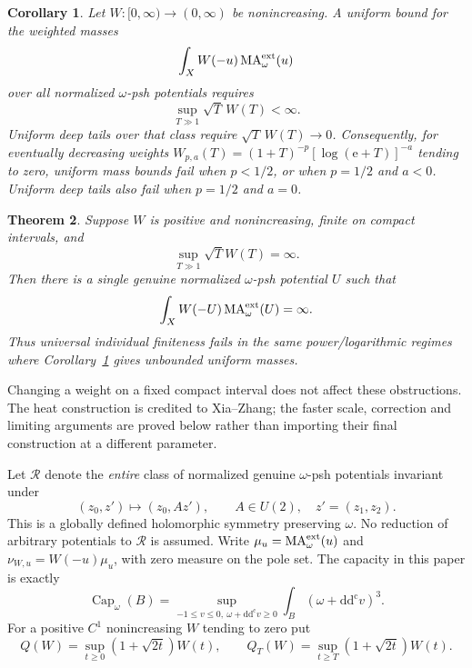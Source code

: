 \documentclass[11pt]{article}
\newtheorem{theorem}{Theorem}
\newtheorem{corollary}[theorem]{Corollary}
\theoremstyle{remark}
\newcommand{\ddc}{\mathrm{d}\mathrm{d}^{\mathrm c}}
\newcommand{\MA}{\operatorname{MA}}
\begin{document}
\begin{corollary}\label{cor:weights}
Let $W:[0,\infty)\to(0,\infty)$ be nonincreasing. A uniform bound for the
weighted masses
\[
 \int_X W(-u)\MA^{\rm ext}_\omega(u)
\]
over all normalized $\omega$-psh potentials requires
\[
 \sup_{T\gg1}\sqrt T\,W(T)<\infty.
\]
Uniform deep tails over that class require $\sqrt T\,W(T)\to0$.
Consequently, for eventually decreasing weights
$W_{p,a}(T)=(1+T)^{-p}[\log(\mathrm e+T)]^{-a}$ tending to zero,
uniform mass bounds fail when $p<1/2$, or when $p=1/2$ and $a<0$.
Uniform deep tails also fail when $p=1/2$ and $a=0$.
\end{corollary}

\begin{theorem}\label{thm:individual}
Suppose $W$ is positive and nonincreasing, finite on compact intervals, and
\[
 \sup_{T\gg1}\sqrt T W(T)=\infty.
\]
Then there is a single genuine normalized $\omega$-psh potential $U$ such that
\[
 \int_XW(-U)\MA^{\rm ext}_\omega(U)=\infty.
\]
Thus universal individual finiteness fails in the same power/logarithmic
regimes where Corollary~\ref{cor:weights} gives unbounded uniform masses.
\end{theorem}

Changing a weight on a fixed compact interval does not affect these
obstructions. The heat construction is credited to Xia--Zhang; the faster
scale, correction and limiting arguments are proved below rather than
importing their final construction at a different parameter.

Let $\mathcal R$ denote the \emph{entire} class of normalized genuine
$\omega$-psh potentials invariant under
\[
 (z_0,z')\longmapsto(z_0,Az'),\qquad A\in U(2),\quad z'=(z_1,z_2).
\]
This is a globally defined holomorphic symmetry preserving $\omega$.
No reduction of arbitrary potentials to $\mathcal R$ is assumed. Write
$\mu_u=\MA^{\rm ext}_\omega(u)$ and
$\nu_{W,u}=W(-u)\mu_u$, with zero measure on the pole set.
The capacity in this paper is exactly
\[
 \operatorname{Cap}_\omega(B)=
 \sup_{-1\leq v\leq0,\ \omega+\ddc v\geq0}
       \int_B(\omega+\ddc v)^3.
\]
For a positive $C^1$ nonincreasing $W$ tending to zero put
\[
 Q(W)=\sup_{t\geq0}(1+\sqrt{2t})W(t),\qquad
 Q_T(W)=\sup_{t\geq T}(1+\sqrt{2t})W(t).
\]
\end{document}
